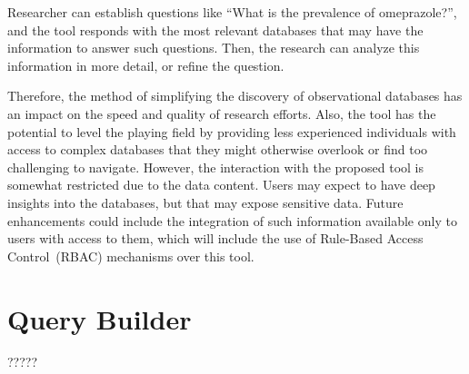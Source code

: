Researcher can establish questions like ``What is the prevalence of omeprazole?'', and the tool responds with the most relevant databases that may have the information to answer such questions. Then, the research can analyze this information in more detail, or refine the question. %

Therefore, the method of simplifying the discovery of observational databases has an impact on the speed and quality of research efforts. Also, the tool has the potential to level the playing field by providing less experienced individuals with access to complex databases that they might otherwise overlook or find too challenging to navigate. However, the interaction with the proposed tool is somewhat restricted due to the data content. Users may expect to have deep insights into the databases, but that may expose sensitive data. Future enhancements could include the integration of such information available only to users with access to them, which will include the use of Rule-Based Access Control~(RBAC) mechanisms over this tool.



\section{Query Builder}


?????
